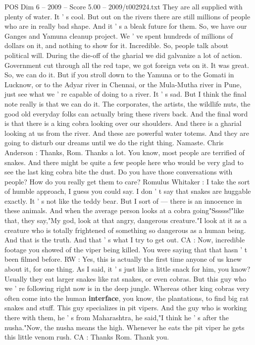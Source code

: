 \begin{textsample}{POS Dim 6 – 2009 – Score 5.00 – 2009/t002924.txt}
They are all supplied with plenty of water.
It ' s cool.
But out on the rivers there are still millions of people who are in really bad shape.
And it ' s a bleak future for them.
So, we have our Ganges and Yamuna cleanup project.
We ' ve spent hundreds of millions of dollars on it, and nothing to show for it.
Incredible.
So, people talk about political will.
During the die-off of the gharial we did galvanize a lot of action.
Government cut through all the red tape, we got foreign vets on it.
It was great.
So, we can do it.
But if you stroll down to the Yamuna or to the Gomati in Lucknow, or to the Adyar river in Chennai, or the Mula-Mutha river in Pune, just see what we ' re capable of doing to a river.
It ' s sad.
But I think the final note really is that we can do it.
The corporates, the artists, the wildlife nuts, the good old everyday folks can actually bring these rivers back.
And the final word is that there is a king cobra looking over our shoulders.
And there is a gharial looking at us from the river.
And these are powerful water totems.
And they are going to disturb our dreams until we do the right thing.
Namaste.
Chris Anderson : Thanks, Rom.
Thanks a lot.
You know, most people are terrified of snakes.
And there might be quite a few people here who would be very glad to see the last king cobra bite the dust.
Do you have those conversations with people?
How do you really get them to care?
Romulus Whitaker : I take the sort of humble approach, I guess you could say.
I don ' t say that snakes are huggable exactly.
It ' s not like the teddy bear.
But I sort of — there is an innocence in these animals.
And when the average person looks at a cobra going"Ssssss!"like that, they say,"My god, look at that angry, dangerous creature."I look at it as a creature who is totally frightened of something so dangerous as a human being.
And that is the truth.
And that ' s what I try to get out.
CA : Now, incredible footage you showed of the viper being killed.
You were saying that that hasn ' t been filmed before.
RW : Yes, this is actually the first time anyone of us knew about it, for one thing.
As I said, it ' s just like a little snack for him, you know?
Usually they eat larger snakes like rat snakes, or even cobras.
But this guy who we ' re following right now is in the deep jungle.
Whereas other king cobras very often come into the human \textbf{interface}, you know, the plantations, to find big rat snakes and stuff.
This guy specializes in pit vipers.
And the guy who is working there with them, he ' s from Maharashtra, he said,"I think he ' s after the nusha."Now, the nusha means the high.
Whenever he eats the pit viper he gets this little venom rush.
CA : Thanks Rom.
Thank you.

\end{textsample}
